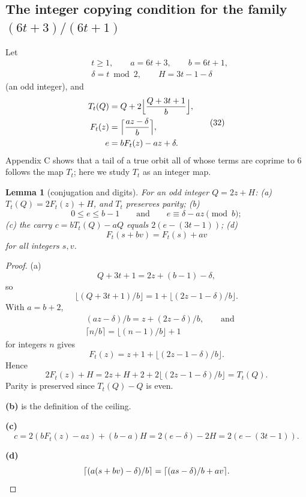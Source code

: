 \documentclass[11pt,reqno]{amsart}
\newtheorem{lemma}[theorem]{Lemma}
\theoremstyle{definition}
\theoremstyle{remark}
\begin{document}
\subsection{\texorpdfstring{The integer copying condition for the family \((6t+3)/(6t+1)\)}{The integer copying condition for the family (6t+3)/(6t+1)}}\label{sec:B.4}

Let
\[
\begin{aligned}
&t\ge1,\qquad a=6t+3,\qquad b=6t+1,\\
&\delta=t\bmod2,\qquad H=3t-1-\delta
\end{aligned}
\]
(an odd integer), and
\[
\begin{aligned}
T_t(Q)&=Q+2\Bigl\lfloor\frac{Q+3t+1}{b}\Bigr\rfloor,\\
F_t(z)&=\Bigl\lceil\frac{az-\delta}{b}\Bigr\rceil,\\
e&=bF_t(z)-az+\delta .
\end{aligned}
\tag{32}\label{eq:32}
\]
Appendix C shows that a tail of a true orbit all of whose terms are
coprime to \(6\) follows the map \(T_t\); here we study \(T_t\) as an
integer map.

\begin{samepage}
\begin{lemma}[conjugation and digits]\leavevmode\label{thm:52}
For an odd integer \(Q=2z+H\):
(a) \(T_t(Q)=2F_t(z)+H\), and \(T_t\) preserves parity; (b)
\[
0\le e\le b-1\qquad \text{and}\qquad e\equiv\delta-az\pmod b;
\]
(c) the carry
\(c=bT_t(Q)-aQ\) equals \(2(e-(3t-1))\); (d)
\[
F_t(s+bv)=F_t(s)+av
\]
for all integers \(s,v\).
\label{thm-end:52}
\end{lemma}
\end{samepage}

\begin{proof}\leavevmode\label{proof:52}
(a)
\[
Q+3t+1=2z+(b-1)-\delta,
\]
so
\[
\lfloor(Q+3t+1)/b\rfloor=1+\lfloor(2z-1-\delta)/b\rfloor.
\]
With
\(a=b+2\),
\[
\begin{aligned}
&(az-\delta)/b=z+(2z-\delta)/b,\qquad\text{and}\\
&\lceil n/b\rceil=\lfloor(n-1)/b\rfloor+1
\end{aligned}
\]
for integers \(n\) gives
\[
F_t(z)=z+1+\lfloor(2z-1-\delta)/b\rfloor.
\]
Hence
\[
2F_t(z)+H=2z+H+2+2\lfloor(2z-1-\delta)/b\rfloor=T_t(Q).
\]
Parity is
preserved since \(T_t(Q)-Q\) is even.

\textbf{(b)} is the definition of the
ceiling.

\textbf{(c)}
\[
c=2(bF_t(z)-az)+(b-a)H=2(e-\delta)-2H=2(e-(3t-1)).
\]

\textbf{(d)}
\[
\lceil(a(s+bv)-\delta)/b\rceil=\lceil(as-\delta)/b+av\rceil.\qedhere
\]
\end{proof}
\end{document}
